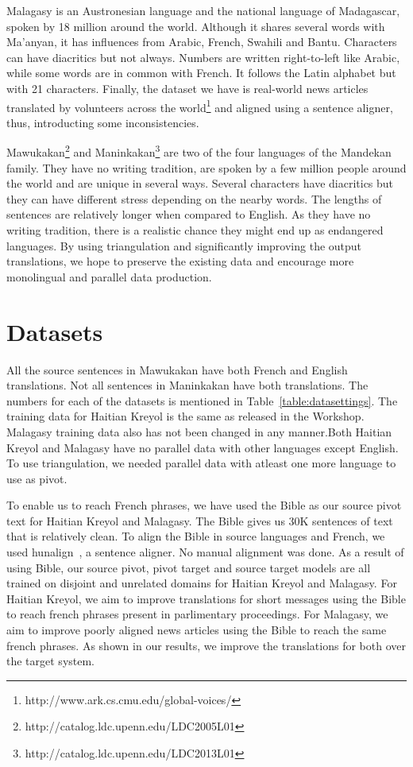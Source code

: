 Malagasy is an Austronesian language and the national language of Madagascar, spoken by 18 million around the world. Although it shares several words with Ma'anyan, it has influences from Arabic, French, Swahili and Bantu. Characters can have diacritics but not always. Numbers are written right-to-left like Arabic, while some words are in common with French. It follows the Latin alphabet but with 21 characters. Finally, the dataset we have is real-world news articles translated by volunteers across the world\footnote{http://www.ark.cs.cmu.edu/global-voices/} and aligned using a sentence aligner, thus, introducting some inconsistencies. 

Mawukakan\footnote{http://catalog.ldc.upenn.edu/LDC2005L01} and Maninkakan\footnote{http://catalog.ldc.upenn.edu/LDC2013L01} are two of the four languages of the Mandekan family. They have no writing tradition, are spoken by a few million people around the world and are unique in several ways. Several characters have diacritics but they can have different stress depending on the nearby words. The lengths of sentences are relatively longer when compared to English. As they have no writing tradition, there is a realistic chance they might end up as endangered languages. By using triangulation and significantly improving the output translations, we hope to preserve the existing data and encourage more monolingual and parallel data production. 

\section{Datasets}
\label{sec:datasets}



All the source sentences in Mawukakan have both French and English translations. Not all sentences in Maninkakan have both translations. The numbers for each of the datasets is mentioned in Table~\ref{table:datasettings}. The training data for Haitian Kreyol is the same as released in the Workshop. Malagasy training data also has not been changed in any manner.Both Haitian Kreyol and Malagasy have no parallel data with other languages except English. To use triangulation, we needed parallel data with atleast one more language to use as pivot. 

To enable us to reach French phrases, we have used the Bible as our source pivot text for Haitian Kreyol and Malagasy. The Bible gives us 30K sentences of text that is relatively clean. To align the Bible in source languages and French, we used hunalign~\cite{Hun:05}, a sentence aligner. No manual alignment was done. As a result of using Bible, our source pivot, pivot target and source target models are all trained on disjoint and unrelated domains for Haitian Kreyol and Malagasy. For Haitian Kreyol, we aim to improve translations for short messages using the Bible to reach french phrases present in parlimentary proceedings. For Malagasy, we aim to improve poorly aligned news articles using the Bible to reach the same french phrases. As shown in our results, we improve the translations for both over the target system. 

